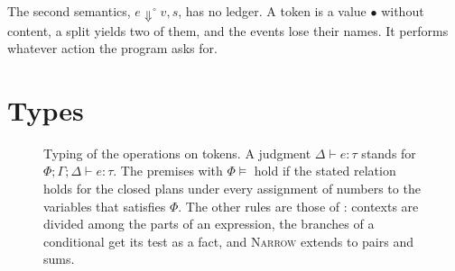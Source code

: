 \documentclass[acmsmall,nonacm,screen]{acmart}
\newcommand{\kw}[1]{\mathsf{#1}}
\newcommand{\Plan}[1]{\kw{Plan}(#1)}
\newcommand{\ask}[1]{\kw{ask}\;#1}
\newcommand{\act}[5]{\kw{act}\;#1\;#2\;#3\;\kw{as}\;(#4)\;\kw{in}\;#5}
\newcommand{\splt}[3]{\kw{split}\;#1\;\kw{as}\;#2 \parallel #3}
\newcommand{\run}[4]{\kw{run}_{#1 \multimap #2}(#3, #4)}
\newcommand{\iter}[4]{\kw{iter}\;#1\;\kw{from}\;#2\;\kw{as}\;#3.\,#4}
\newcommand{\auth}[1]{\mathcal{A}(#1)}
\newcommand{\sh}{\mathbin{\parallel}}
\newcommand{\evto}{\Downarrow}
\begin{document}
The second semantics, $e \evto^{\circ} v, s$, has no ledger. A token is a value $\bullet$
without content, a split yields two of them, and the events lose their names. It performs
whatever action the program asks for.

\section{Types}
\label{sec:types}

\begin{figure}[t]
\caption{Typing of the operations on tokens. A judgment $\Delta \vdash e : \tau$ stands for
$\Phi; \Gamma; \Delta \vdash e : \tau$. The premises with $\Phi \models$ hold if the stated
relation holds for the closed plans under every assignment of numbers to the variables that
satisfies $\Phi$. The other rules are those of \citet{tpp4}: contexts are divided among the
parts of an expression, the branches of a conditional get its test as a fact, and
\textsc{Narrow} extends to pairs and sums.}
\label{fig:typing}
\end{figure}
\end{document}
